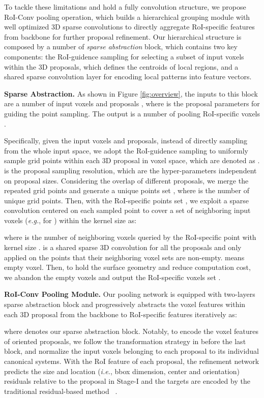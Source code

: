 \documentclass{article}
\begin{document}
To tackle these limitations and hold a fully convolution structure, we propose RoI-Conv pooling operation, which builds a hierarchical grouping module with well optimized 3D sparse convolutions to directly aggregate RoI-specific features from backbone for further proposal refinement. Our hierarchical structure is composed by a number of \textit{sparse abstraction} block, which contains two key components: the RoI-guidence sampling for selecting a subset of input voxels within the 3D proposals, which defines the centroids of local regions, and a shared sparse convolution layer for encoding local patterns into feature vectors. 

\textbf{Sparse Abstraction.}
As shown in Figure \ref{fig:overview}, the inputs to this block are a number of  input voxels   and  proposals , where  is the proposal parameters for guiding the point sampling. The output is a number of  pooling RoI-specific voxels .

Specifically, given the input voxels and proposals, instead of directly sampling from the whole input space, we adopt the RoI-guidence sampling to uniformly sample  grid points within each 3D proposal in voxel space, which are denoted as .  is the proposal sampling resolution, which are the hyper-parameters independent on proposal sizes. Considering the overlap of different proposals, we merge the repeated grid points and generate a unique points set , where  is the number of unique grid points. Then, with the RoI-specific points set , we exploit a sparse convolution centered on each sampled point to cover a set of neighboring input voxels (\textit{e.g.},  for ) within the kernel size  as:
 
where  is the number of neighboring voxels queried by the  RoI-specific point with kernel size .  is a shared sparse 3D convolution for all the proposals and only applied on the points that their neighboring voxel sets are non-empty.  means empty voxel. Then, to hold the surface geometry and reduce computation cost, we abandon the empty voxels and output the RoI-specific voxels set .

\textbf{RoI-Conv Pooling Module.} Our pooling network is equipped with two-layers sparse abstraction block and progressively abstracts the voxel features within each 3D proposal from the backbone to RoI-specific features iteratively as:

where  denotes our sparse abstraction block.
Notably, to encode the voxel features of oriented proposals, we follow the transformation strategy in \cite{shi2020p2} before the last block, and normalize the input voxels belonging to each proposal to its individual canonical systems. With the RoI feature  of each proposal, the refinement network predicts the size and location (\textit{i.e.}, bbox dimension, center and orientation) residuals relative to the proposal in Stage-I and the targets are encoded by the traditional residual-based method ~\cite{shi2020pv,shi2020p2}.
\end{document}
